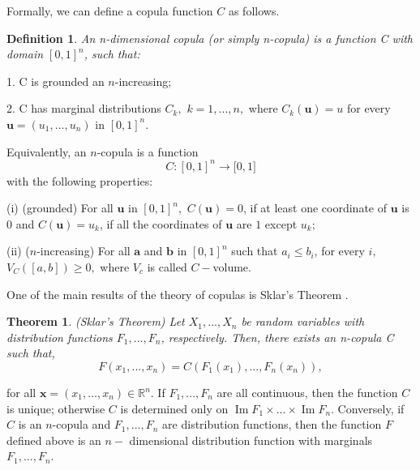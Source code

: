 \documentclass[a4paper,12pt]{report}
\newtheorem{theorem}{Theorem}
\newtheorem{definition}{Definition}
\DeclareMathOperator{\Ima}{Im}
\begin{document}
\bigskip

Formally, we can define a copula function $C$ as follows. \bigskip

\begin{definition}
	An n-dimensional copula (or simply n-copula) is a function C with domain $%
	[0,1]^{n}$, such that:
\end{definition}

1. C is grounded an $n$-increasing;

2. C has marginal distributions $C_{k},$ $k=1,...,n,$ where $C_{k}(\mathbf{u}%
)=u$ for every $\mathbf{u}=\left( u_{1},...,u_{n}\right) $ in $[0,1]^{n}.$

\bigskip

Equivalently, an $n$-copula is a function
\begin{equation*}
C:[0,1]^{n}\rightarrow \lbrack 0,1]
\end{equation*}%
with the following properties:

(i) (grounded) For all $\mathbf{u}$ in $[0,1]^{n},$ $C(\mathbf{u})=0$, if at
least one coordinate of $\mathbf{u}$ is $0$ and $C(\mathbf{u})=u_{k}$, if
all the coordinates of $\mathbf{u}$ are $1$ except $u_{k};$

(ii) ($n$-increasing) For all $\mathbf{a}$ and $\mathbf{b}$ in $[0,1]^{n}$
such that $a_{i}\leq b_{i}$, for every $i,$ $V_{C}\left( \left[ a,b\right]
\right) \geq 0,$ where $V_{c}$ is called $C-$volume.

One of the main results of the theory of copulas is Sklar's Theorem \citet*{%
	sklar1959}.

\bigskip

\begin{theorem}
	(Sklar's Theorem) Let $X_{1},...,X_{n}$ be random variables with
	distribution functions $F_{1},...,F_{n}$, respectively. Then, there exists
	an n-copula C such that,
	\begin{equation}
	F\left( x_{1},...,x_{n}\right) =C\left( F_{1}\left( x_{1}\right)
	,...,F_{n}\left( x_{n}\right) \right) ,  \label{21} 
	\end{equation}
\end{theorem} 
\noindent for all $\mathbf{x}=\left( x_{1},...,x_{n}\right) \in
\mathbb{R}
^{n}$. If $F_{1},...,F_{n}$ are all continuous, then the function $C$ is
unique; otherwise $C$ is determined only on $\Ima F_{1}\times ...\times \Ima %
F_{n}$. Conversely, if $C$ is an $n$-copula and $F_{1},...,F_{n}$ are
distribution functions, then the function $F$ defined above is an $n-$%
dimensional distribution function with marginals $F_{1},...,F_{n}$.
\end{document}
